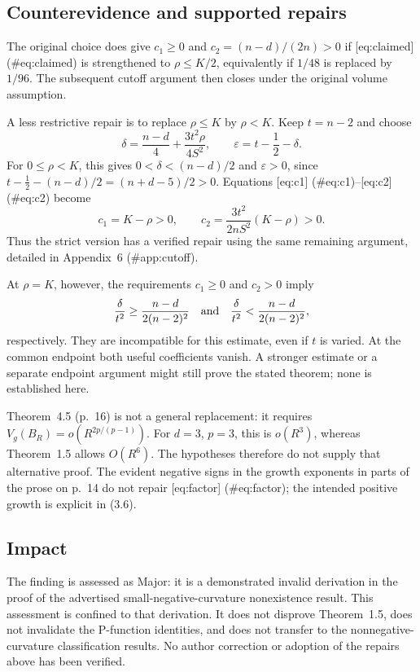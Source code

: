 \documentclass[10pt]{article}
\begin{document}
\subsection*{Counterevidence and supported repairs}
The original choice does give \(c_1\ge0\) and \(c_2=(n-d)/(2n)>0\) if [eq:claimed] (\#eq:claimed) is strengthened to \(\rho\le K/2\), equivalently if \(1/48\) is replaced by \(1/96\). The subsequent cutoff argument then closes under the original volume assumption.\par
A less restrictive repair is to replace \(\rho\le K\) by \(\rho<K\). Keep \(t=n-2\) and choose \[\delta=\frac{n-d}{4}+\frac{3t^2\rho}{4S^2},
 \qquad \varepsilon=t-\frac12-\delta.\] For \(0\le\rho<K\), this gives \(0<\delta<(n-d)/2\) and \(\varepsilon>0\), since \(t-\tfrac12-(n-d)/2=(n+d-5)/2>0\). Equations [eq:c1] (\#eq:c1)–[eq:c2] (\#eq:c2) become \[c_1=K-\rho>0,\qquad
 c_2=\frac{3t^2}{2nS^2}(K-\rho)>0.\] Thus the strict version has a verified repair using the same remaining argument, detailed in Appendix 6 (\#app:cutoff).\par
At \(\rho=K\), however, the requirements \(c_1\ge0\) and \(c_2>0\) imply \[\frac{\delta}{t^2}\ge\frac{n-d}{2(n-2)^2}
 \quad\hbox{and}\quad
 \frac{\delta}{t^2}<\frac{n-d}{2(n-2)^2},\] respectively. They are incompatible for this estimate, even if \(t\) is varied. At the common endpoint both useful coefficients vanish. A stronger estimate or a separate endpoint argument might still prove the stated theorem; none is established here.\par
Theorem 4.5 (p. 16) is not a general replacement: it requires \(V_g(B_R)=o(R^{2p/(p-1)})\). For \(d=3\), \(p=3\), this is \(o(R^3)\), whereas Theorem 1.5 allows \(O(R^6)\). The hypotheses therefore do not supply that alternative proof. The evident negative signs in the growth exponents in parts of the prose on p. 14 do not repair [eq:factor] (\#eq:factor); the intended positive growth is explicit in (3.6).\par
\subsection*{Impact}
The finding is assessed as Major: it is a demonstrated invalid derivation in the proof of the advertised small-negative-curvature nonexistence result. This assessment is confined to that derivation. It does not disprove Theorem 1.5, does not invalidate the P-function identities, and does not transfer to the nonnegative-curvature classification results. No author correction or adoption of the repairs above has been verified.\par
\end{document}
